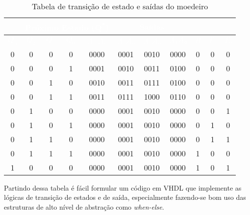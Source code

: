 \documentclass[a4paper,12pt]{article}
\begin{document}
\begin{table}[H]
    \centering
    \footnotesize
    \renewcommand{\arraystretch}{1.3}
    \begin{tabular}{|c|c|c|c|c|c|c|c|c|c|c|}
        \hline
        \rowcolor{black}
        \multicolumn{4}{|c|}{\textbf{\textcolor{white}{Estado Atual}}} & \multicolumn{4}{c|}{\textbf{\textcolor{white}{Próximo Estado (Q\textsuperscript{*})}}} & \multicolumn{3}{c|}{\textbf{\textcolor{white}{Saídas}}} \\ \hline
        \rowcolor{black}
        \textcolor{white}{$Q_3$} & \textcolor{white}{$Q_2$} & \textcolor{white}{$Q_1$} & \textcolor{white}{$Q_0$} & 
        \textcolor{white}{$\overline{A_1} \ \overline{A_0}$} & \textcolor{white}{$\overline{A_1}A_0$} & \textcolor{white}{$A_1\overline{A_0}$} & \textcolor{white}{$A_1A_0$} & 
        \textcolor{white}{$R$} & \textcolor{white}{$T_1$} & \textcolor{white}{$T_0$} \\ \hline

        0 & 0 & 0 & 0 & 0000 & 0001 & 0010 & 0000 & 0 & 0 & 0 \\ \hline
        \rowcolor{cinza}
        0 & 0 & 0 & 1 & 0001 & 0010 & 0011 & 0100 & 0 & 0 & 0 \\ \hline
        0 & 0 & 1 & 0 & 0010 & 0011 & 0111 & 0100 & 0 & 0 & 0 \\ \hline
        \rowcolor{cinza}
        0 & 0 & 1 & 1 & 0011 & 0111 & 1000 & 0110 & 0 & 0 & 0 \\ \hline
        0 & 1 & 0 & 0 & 0000 & 0001 & 0010 & 0000 & 0 & 0 & 1 \\ \hline
        \rowcolor{cinza}
        0 & 1 & 0 & 1 & 0000 & 0001 & 0010 & 0000 & 0 & 1 & 0 \\ \hline
        0 & 1 & 1 & 0 & 0000 & 0001 & 0010 & 0000 & 0 & 1 & 1 \\ \hline
        \rowcolor{cinza}
        0 & 1 & 1 & 1 & 0000 & 0001 & 0010 & 0000 & 1 & 0 & 0 \\ \hline
        1 & 0 & 0 & 0 & 0000 & 0001 & 0010 & 0000 & 1 & 0 & 1 \\ \hline
    \end{tabular}
    \caption{Tabela de transição de estado e saídas do moedeiro}
    \label{tab}
\end{table}

\noindent Partindo dessa tabela é fácil formular um código em VHDL que implemente as lógicas de transição de estados e de saída, especialmente fazendo-se bom uso das estruturas de alto nível de abstração como \textit{when-else}.
\end{document}
